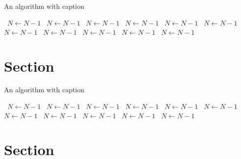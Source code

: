 \documentclass[a4paper]{article}
\begin{document}
\begin{algorithm}
\caption{An algorithm with caption}
\begin{algorithmic}
\    \State $N \gets N - 1$
\    \State $N \gets N - 1$
\    \State $N \gets N - 1$
\    \State $N \gets N - 1$
\    \State $N \gets N - 1$
\    \State $N \gets N - 1$
\    \State $N \gets N - 1$
\    \State $N \gets N - 1$
\    \State $N \gets N - 1$
\    \State $N \gets N - 1$
\    \State $N \gets N - 1$
\EndWhile
\end{algorithmic}
\end{algorithm}

\section{Section}

\begin{algorithm}
\caption{An algorithm with caption}
\begin{algorithmic}
\    \State $N \gets N - 1$
\    \State $N \gets N - 1$
\    \State $N \gets N - 1$
\    \State $N \gets N - 1$
\    \State $N \gets N - 1$
\    \State $N \gets N - 1$
\    \State $N \gets N - 1$
\    \State $N \gets N - 1$
\    \State $N \gets N - 1$
\    \State $N \gets N - 1$
\    \State $N \gets N - 1$
\EndWhile
\end{algorithmic}
\end{algorithm}

\section{Section}
\end{document}

